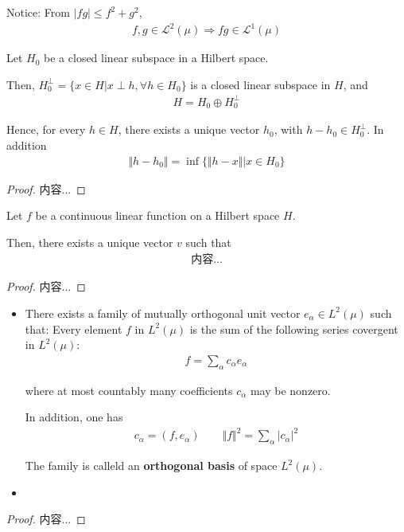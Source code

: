 \documentclass[Total.tex]{subfiles}
\begin{document}
		
		Notice: From $|fg|\leq f^2+g^2$, 
		\begin{gather*}
			f,g\in \mathcal{L}^2(\mu)\Rightarrow fg\in \mathcal{L}^1(\mu)
		\end{gather*}
		
		\begin{proposition}
			Let $H_0$ be a closed linear subspace in a Hilbert space.
			
			Then, $H_0^\perp=\{x\in H|x\perp h,\forall h\in H_0\}$ is a closed linear subspace in $H$, and 
			\begin{gather*}
				H=H_0\oplus H_0^\perp
			\end{gather*}
			
			Hence, for every $h\in H$, there exists a unique vector $h_0$, with $h-h_0\in H_0^\perp$. In addition
			\begin{gather*}
				\Vert h-h_0\Vert=\inf\{\Vert h-x\Vert|x\in H_0\}
			\end{gather*}
		\end{proposition}
		\begin{proof}
			内容...
		\end{proof}
		
		\begin{corollary}
			Let $f$ be a continuous linear function on a Hilbert space $H$.
			
			Then, there exists a unique vector $v$ such that
			\begin{gather*}
				内容...
			\end{gather*}
		\end{corollary}
		\begin{proof}
			内容...
		\end{proof}
		
		\begin{corollary}
			\begin{itemize}
				\item 
				There exists a family of mutually orthogonal unit vector $e_\alpha\in L^2(\mu)$ such that: Every element $f$ in $L^2(\mu)$ is the sum of the following series covergent in $L^2(\mu)$:
				\begin{gather*}
					f=\sum_\alpha c_\alpha e_\alpha
				\end{gather*}
				
				where at most countably many coefficients $c_\alpha$ may be nonzero. 
				
				In addition, one has
				\begin{gather*}
					c_\alpha=(f,e_\alpha)\qquad \Vert f\Vert^2=\sum_\alpha |c_\alpha|^2
				\end{gather*}
				
				The family is calleld an \textbf{orthogonal basis} of space $L^2(\mu)$.
				\item 
			\end{itemize}
		\end{corollary}
		\begin{proof}
			内容...
		\end{proof}
		
\end{document}
